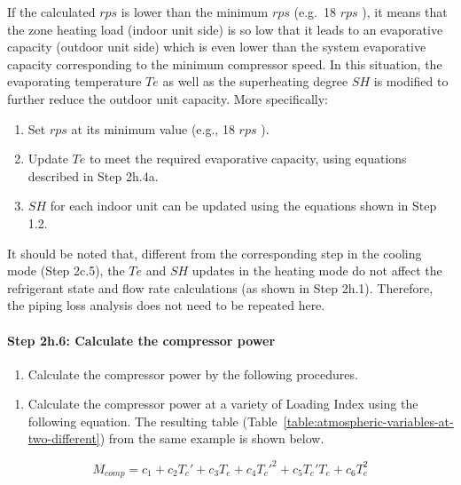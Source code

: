 If the calculated \(rps\) is lower than the minimum \(rps\) (e.g.~18 \(rps\) ), it means that the zone heating load (indoor unit side) is so low that it leads to an evaporative capacity (outdoor unit side) which is even lower than the system evaporative capacity corresponding to the minimum compressor speed. In this situation, the evaporating temperature \(Te\) as well as the superheating degree \(SH\) is modified to further reduce the outdoor unit capacity. More specifically:

\begin{enumerate}
\def\labelenumi{\alph{enumi}.}
\item
  Set \(rps\) at its minimum value (e.g., 18 \(rps\) ).
\item
  Update \(Te\) to meet the required evaporative capacity, using equations described in Step 2h.4a.
\item
  \(SH\) for each indoor unit can be updated using the equations shown in Step 1.2.
\end{enumerate}

It should be noted that, different from the corresponding step in the cooling mode (Step 2c.5), the \(Te\) and \(SH\) updates in the heating mode do not affect the refrigerant state and flow rate calculations (as shown in Step 2h.1). Therefore, the piping loss analysis does not need to be repeated here.

\paragraph{Step 2h.6: Calculate the compressor power}\label{step-2h.6-calculate-the-compressor-power}

\begin{enumerate}
\def\labelenumi{(\arabic{enumi})}
\tightlist
\item
  Calculate the compressor power by the following procedures. 
\end{enumerate}

\begin{enumerate}
\def\labelenumi{\alph{enumi}.}
\tightlist
\item
  Calculate the compressor power at a variety of Loading Index using the following equation. The resulting table (Table~\ref{table:atmospheric-variables-at-two-different}) from the same example is shown below.
\end{enumerate}

\begin{equation}
  M_{comp} = c_1+c_2{T_c}'+c_3T_e+c_4{T_c}'^2+c_5{T_c}'T_e+c_6T_e^2
\end{equation}

